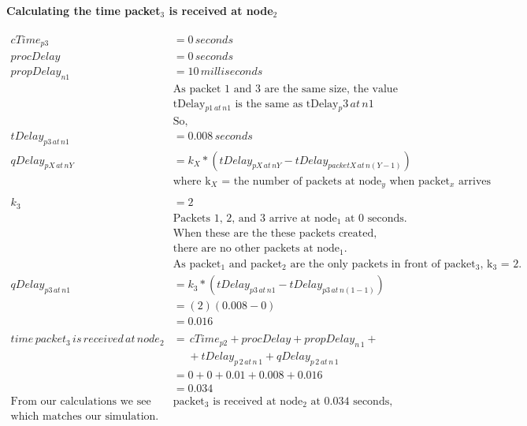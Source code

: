 \documentclass[fleqn,11pt]{article}
\begin{document}
\paragraph{Calculating the time packet$_3$ is received at node$_2$ }
\begin{align*}
cTime_{p3} &= 0\,seconds\\
procDelay &= 0\,seconds\\
propDelay_{n1} &= 10\,milliseconds\\
&\text{As packet 1 and 3 are the same size, the value for}\\
&\text{tDelay$_{p1\,at\,n1}$ is the same as tDelay${_p3\,at\,n1}$}\\
&\text{So,}\\
tDelay_{p3\,at\,n1} &=  0.008 \,seconds\\
qDelay_{pX\,at\,nY} &= k_{X}*(tDelay_{pX\,at\,nY} - tDelay_{packetX\,at\,n(Y-1)}) \\
&\text{where k$_X$ = the number of packets at node$_y$ when packet$_x$ arrives}\\
\\
k_{3} &= 2\\
&\text{Packets 1, 2, and 3 arrive at node$_1$ at 0 seconds.}\\
&\text{When these are the these packets created,}\\
&\text{there are no other packets at node$_1$.}\\
&\text{As packet$_1$ and packet$_2$ are the only packets in front of packet$_3$, k$_3$ = 2.} \\
qDelay_{p3\,at\,n1} &= k_{3}*(tDelay_{p3\,at\,n1} - tDelay_{p3\,at\,n(1-1)})\\
&= (2) (0.008 - 0) \\
&= 0.016 \\
\\
time\,packet_{3}\,is\,received\,at\,node_{2}  &= \,cTime_{p2} + procDelay + propDelay_{n\,1} +\\
&\,\,\,\,\,\,\,\, + tDelay_{p\,2\,at\,n\,1} + qDelay_{p\,2\,at\,n\,1} \\
&= 0 + 0 + 0.01 + 0.008 + 0.016 \\
&= 0.034\\
\text{From our calculations we see that }
&\text{packet$_3$ is received at node$_2$ at 0.034 seconds,} \\
\text{which matches our simulation.}
\end{align*}
\end{document}
